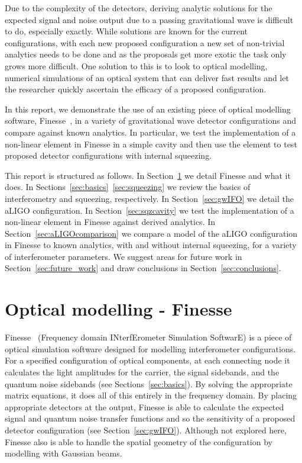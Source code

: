 \documentclass[aps,pra,superscriptaddress,reprint,nofootinbib]{revtex4-1}
\begin{document}
Due to the complexity of the detectors, deriving analytic solutions for the expected signal and noise output due to a passing gravitational wave is difficult to do, especially exactly. %
While solutions are known for the current configurations, with each new proposed configuration a new set of non-trivial analytics needs to be done and as the proposals get more exotic the task only grows more difficult.
One solution to this is to look to optical modelling, numerical simulations of an optical system that can deliver fast results and let the researcher quickly ascertain the efficacy of a proposed configuration. 


In this report, we demonstrate the use of an existing piece of optical modelling software, Finesse~\cite{finesse}, in a variety of gravitational wave detector configurations and compare against known analytics. In particular, we test the implementation of a non-linear element in Finesse in a simple cavity and then use the element to test proposed detector configurations with internal squeezing.


This report is structured as follows.
In Section~\ref{sec:Finesse} we detail Finesse and what it does. In Sections~\ref{sec:basics}~\ref{sec:squeezing} we review the basics of interferometry and squeezing, respectively. In Section~\ref{sec:gwIFO} we detail the aLIGO configuration. In Section~\ref{sec:sqzcavity} we test the implementation of a non-linear element in Finesse against derived analytics. %
In Section~\ref{sec:aLIGOcomparison} we compare a model of the aLIGO configuration in Finesse to known analytics, with and without internal squeezing, for a variety of interferometer parameters.
We suggest areas for future work in Section~\ref{sec:future_work} and draw conclusions in Section~\ref{sec:conclusions}.


\section{Optical modelling - Finesse}
\label{sec:Finesse}

Finesse~\cite{finesse} (Frequency domain INterfErometer Simulation SoftwarE) is a piece of optical simulation software designed for modelling interferometer configurations. For a specified configuration of optical components, at each connecting node it calculates the light amplitudes for the carrier, the signal sidebands, and the quantum noise sidebands (see Sections~\ref{sec:basics}). By solving the appropriate matrix equations, it does all of this entirely in the frequency domain. By placing appropriate detectors at the output, Finesse is able to calculate the expected signal and quantum noise transfer functions and so the sensitivity of a proposed detector configuration (see Section~\ref{sec:gwIFO}).
Although not explored here, Finesse also is able to handle the spatial geometry of the configuration by modelling with Gaussian beams.
\end{document}
